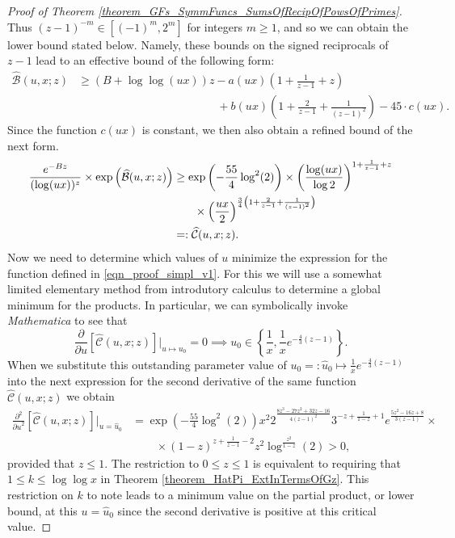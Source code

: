 \documentclass[11pt,reqno,a4letter]{article}
\numberwithin{figure}{section}
\numberwithin{table}{section}
\theoremstyle{plain}
\numberwithin{theorem}{section}
\theoremstyle{definition}
\begin{document}
\begin{proof}[Proof of Theorem \ref{theorem_GFs_SymmFuncs_SumsOfRecipOfPowsOfPrimes}]
Thus $(z-1)^{-m} \in [(-1)^m, 2^m]$ for integers $m \geq 1$, and so we can obtain the 
lower bound stated below. Namely, these bounds on the signed reciprocals of $z-1$ 
lead to an effective bound of the following form: 
\begin{align*} 
\widehat{\mathcal{B}}(u, x; z) & \geq (B + \log\log (ux)) z - a(ux) \left(1 + \frac{1}{z-1} + z\right) \\ 
     & \phantom{= (B + \log\log (ux)) z\ } + 
     b(ux) \left( 
     1 + \frac{2}{z-1} + \frac{1}{(z-1)^2}\right) - 
     45 \cdot c(ux). 
\end{align*} 
Since the function $c(ux)$ is constant, we then also obtain a refined bound of the next form. 
\begin{align} 
\notag 
\frac{e^{-Bz}}{(\log (ux))^{z}} \times \exp\left(\widehat{\mathcal{B}}(u, x; z)\right) & \geq 
    \exp\left(-\frac{55}{4} \log^2(2)\right) \times \left(\frac{\log(ux)}{\log 2}\right)^{1 + \frac{1}{z-1} + z} \\ 
\notag 
    & \phantom{\geq \times} \times \left(\frac{ux}{2}\right)^{\frac{3}{4}\left(1 + \frac{2}{z-1} + \frac{1}{(z-1)^2}\right)} \\ 
\label{eqn_proof_simpl_v1} 
     & =: \widehat{\mathcal{C}}(u, x; z). 
\end{align} 
Now we need to determine which values of $u$ minimize the expression for the function defined 
in \eqref{eqn_proof_simpl_v1}. 
For this we will use a somewhat limited elementary method from 
introdutory calculus to determine a global minimum for the products. 
In particular, we can symbolically invoke \emph{Mathematica} to see that 
\[
\frac{\partial}{\partial u}\left[\widehat{\mathcal{C}}(u, x; z)\right] \Biggr\rvert_{u \mapsto u_0} = 0 \implies 
     u_0 \in \left\{\frac{1}{x}, \frac{1}{x} e^{-\frac{4}{3}(z-1)}\right\}. 
\]
When we substitute this outstanding parameter value of $u_0 =: \hat{u}_0 \mapsto \frac{1}{x} e^{-\frac{4}{3}(z-1)}$ 
into the next expression for the second derivative of the same function 
$\widehat{\mathcal{C}}(u, x; z)$ we obtain 
\begin{align*} 
\frac{\partial^2}{{\partial u}^2}\left[\widehat{\mathcal{C}}(u, x; z)\right] \Biggr\rvert_{u = \hat{u}_0} & = 
     \exp\left(-\frac{55}{4} \log^2(2)\right) x^2 2^{\frac{8 z^3-27 z^2+32 z-16}{4 (z-1)^2}} 
     3^{-z+\frac{1}{1-z}+1} e^{\frac{5 z^2-16 z+8}{3 (z-1)}} \times \\ 
     & \phantom{=\times} \times (1-z)^{z+\frac{1}{z-1}-2} z^2
     \log^{\frac{z^2}{1-z}}(2) > 0, 
\end{align*} 
provided that $z \leq 1$. 
The restriction to $0 \leq z \leq 1$ is equivalent to requiring that 
$1 \leq k \leq \log\log x$ in Theorem \ref{theorem_HatPi_ExtInTermsOfGz}. 
This restriction on $k$ to note 
leads to a minimum value on the partial product, or lower bound, at this $u = \hat{u}_0$ 
since the second derivative is positive at this critical value. 


\end{proof}
\end{document}
